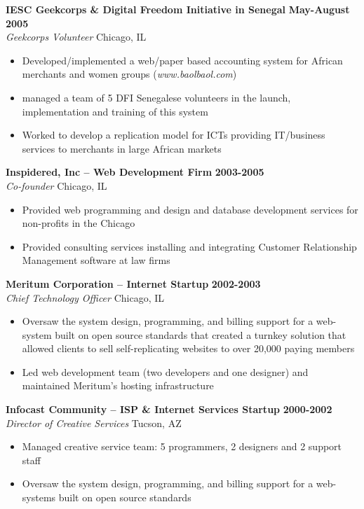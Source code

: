 \documentclass{res}
\begin{document}
\begin{resume}
\textbf{IESC Geekcorps \& Digital Freedom Initiative in Senegal} \hfill \textbf{May-August 2005} \\
\emph{Geekcorps Volunteer} \hfill Chicago, IL
 \begin{itemize} \itemsep -2pt
  \item  Developed/implemented a web/paper based accounting system for African merchants and women groups (\emph{www.baolbaol.com})
  \item managed a team of 5 DFI Senegalese volunteers in the launch, implementation and training of this system  
  \item Worked to develop a replication model for ICTs providing IT/business services to merchants in large African markets 
\end{itemize} \vspace{-6pt}

\textbf{Inspidered, Inc -- Web Development Firm} \hfill \textbf{2003-2005} \\
\emph{Co-founder} \hfill Chicago, IL
 \begin{itemize} \itemsep -2pt
  \item  Provided web programming and design and database development services for non-profits in the Chicago 
  \item Provided consulting services installing and integrating Customer Relationship Management software at law firms
 \end{itemize} \vspace{-6pt}
 
\textbf{Meritum Corporation -- Internet Startup} \hfill \textbf{2002-2003} \\
\emph{Chief Technology Officer} \hfill Chicago, IL
 \begin{itemize} \itemsep -2pt
  \item Oversaw the system design, programming, and billing support for a web-system built on open source standards that created a 
	turnkey solution that allowed clients to sell self-replicating websites to over 20,000 paying members
  \item Led web development team (two developers and one designer) and maintained Meritum’s hosting infrastructure 
\end{itemize} \vspace{-6pt}

\textbf{Infocast Community -- ISP \& Internet Services Startup} \hfill \textbf{2000-2002} \\
\emph{Director of Creative Services} \hfill Tucson, AZ
 \begin{itemize} \itemsep -2pt
  \item Managed creative service team: 5 programmers, 2 designers and 2 support staff
  \item Oversaw the system design, programming, and billing support for a web-systems built on open source standards
\end{itemize} \vspace{-6pt}


\end{resume}
\end{document}
